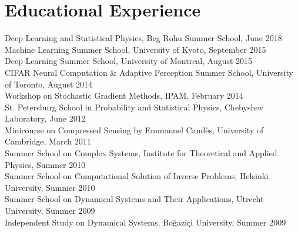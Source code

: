 \documentclass[10pt,letterpaper]{article}
\renewenvironment{itemize}
{
\begin{list}{}{\setlength{\leftmargin}{1.5em}}
}
{
  \end{list}
}
\begin{document}
\section*{Educational Experience}
\begin{itemize}
\item Deep Learning and Statistical Physics, Beg Rohu Summer School, June 2018 \\
Machine Learning Summer School, University of Kyoto, September 2015 \\ 
Deep Learning Summer School, University of Montreal, August 2015 \\ 
CIFAR Neural Computation \& Adaptive Perception Summer School, University of Toronto, August 2014 \\ 
Workshop on Stochastic Gradient Methods, IPAM, February 2014 \\ 
St. Petersburg School in Probability and Statistical Physics, Chebyshev Laboratory, June 2012 \\ 
Minicourse on Compressed Sensing by Emmanuel Cand\`{e}s, University of Cambridge, March 2011 \\ 
Summer School on Complex Systems, Institute for Theoretical and Applied Physics, Summer 2010 \\ 
Summer School on Computational Solution of Inverse Problems, Helsinki University, Summer 2010 \\ 
Summer School on Dynamical Systems and Their Applications, Utrecht University, Summer 2009 \\ 
Independent Study on Dynamical Systems, Bo\u{g}azi\c{c}i University, Summer 2009 
\end{itemize}

\end{document}
